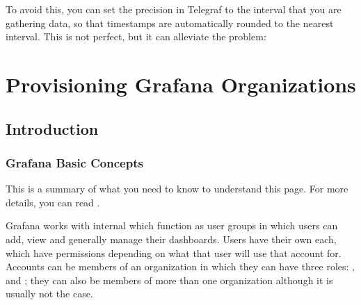 \documentclass[letterpaper,10pt,english]{sphinxmanual}
\begin{document}
To avoid this, you can set the precision in Telegraf to the interval that you
are gathering data, so that timestamps are automatically rounded to the nearest
interval. This is not perfect, but it can alleviate the problem:

\begin{sphinxVerbatim}[commandchars=\\\{\}]
\PYG{p}{[}\PYG{p}{]}
     
\end{sphinxVerbatim}

\begin{DUlineblock}{0em}
\item[] 
\item[] 
\end{DUlineblock}


\chapter{Provisioning Grafana Organizations}
\label{\detokenize{inputStructure:provisioning-grafana-organizations}}\label{\detokenize{inputStructure::doc}}

\section{Introduction}
\label{\detokenize{inputStructure:introduction}}

\subsection{Grafana Basic Concepts}
\label{\detokenize{inputStructure:grafana-basic-concepts}}
This is a summary of what you need to know to understand this page. For more
details, you can read
.

Grafana works with internal  which function as user groups in
which users can add, view and generally manage their dashboards. Users have
their own  each, which have permissions depending on what that user
will use that account for. Accounts can be members of an organization in which
they can have three roles: ,  and ; they can also be
members of more than one organization although it is usually not the case.
\end{document}
